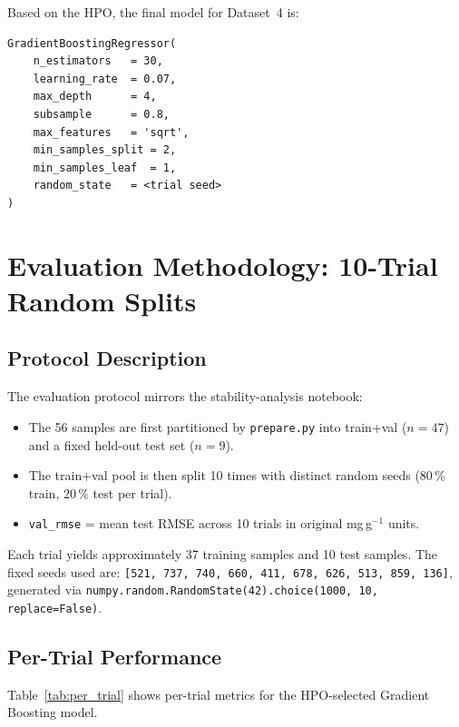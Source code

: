 \documentclass[12pt,a4paper]{article}
\begin{document}
Based on the HPO, the final model for Dataset~4 is:
\begin{verbatim}
GradientBoostingRegressor(
    n_estimators   = 30,
    learning_rate  = 0.07,
    max_depth      = 4,
    subsample      = 0.8,
    max_features   = 'sqrt',
    min_samples_split = 2,
    min_samples_leaf  = 1,
    random_state   = <trial seed>
)
\end{verbatim}

\section{Evaluation Methodology: 10-Trial Random Splits}
\label{sec:eval}

\subsection{Protocol Description}

The evaluation protocol mirrors the stability-analysis notebook:
\begin{itemize}[leftmargin=*]
  \item The 56 samples are first partitioned by \texttt{prepare.py} into
        train+val ($n=47$) and a fixed held-out test set ($n=9$).
  \item The train+val pool is then split 10 times with distinct random
        seeds (80\,\% train, 20\,\% test per trial).
  \item \texttt{val\_rmse} = mean test RMSE across 10 trials in original
        mg\,g$^{-1}$ units.
\end{itemize}

Each trial yields approximately 37 training samples and 10 test samples.
The fixed seeds used are:
\texttt{[521, 737, 740, 660, 411, 678, 626, 513, 859, 136]}, generated via
\texttt{numpy.random.RandomState(42).choice(1000, 10, replace=False)}.

\subsection{Per-Trial Performance}

Table~\ref{tab:per_trial} shows per-trial metrics for the HPO-selected
Gradient Boosting model.
\end{document}
